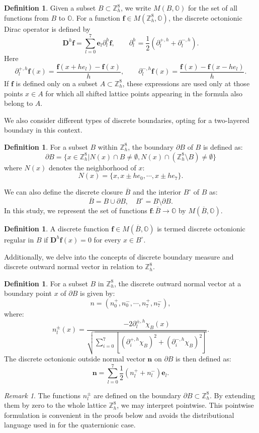 \documentclass{amsart}
\theoremstyle{definition}
\newtheorem{definition}[theorem]{Definition}
\theoremstyle{remark}
\newtheorem{remark}[theorem]{Remark}
\numberwithin{equation}{section}
\newcommand{\p}{\partial}
\newcommand{\OO}{\mathbb O}
\newcommand{\Z}{\mathbb Z}
\newcommand{\f}{\bm{f}}
\newcommand{\e}{\bm{e}}
\begin{document}
 \begin{definition}
 	Given a subset \(B\subset \Z^8_h\), we write \(M(B,\OO)\) for the set of all functions from \(B\) to \(\OO\). For a function \(\f\in M(\Z^8_h,\OO)\), the discrete octonionic Dirac operator is defined by
 	\[
 		\bm D^h \f = \sum_{l=0}^7 \e_l \p^h_l \f,
 		\qquad
 		\p^h_l=\frac12(\p_l^{+,h}+\p_l^{-,h}).
 	\]
 	Here
 	\[
 		\p_l^{+,h}\f(x)=\frac{\f(x+he_l)-\f(x)}{h},
 		\qquad
 		\p_l^{-,h}\f(x)=\frac{\f(x)-\f(x-he_l)}{h}.
 	\]
 	If \(\f\) is defined only on a subset \(A\subset \Z_h^8\), these expressions are used only at those points \(x\in A\) for which all shifted lattice points appearing in the formula also belong to \(A\).
 \end{definition}
 We also consider different types of discrete boundaries, opting for a two-layered boundary in this context.
 \begin{definition}
 	For a subset \(B\) within $\Z^8_h$, the boundary \( \p B \) of \(B\) is defined as:
 	\[ \p B = \{ x \in \Z^8_h | N(x) \cap B \neq \emptyset, N(x) \cap (\Z^8_h \setminus B) \neq \emptyset \} \]
 	where \(N(x)\) denotes the neighborhood of \(x\):
 	\[ N(x) = \{ x, x \pm he_0, \cdots, x \pm he_7 \}. \]
 \end{definition}
 We can also define the discrete closure \( \overline{B} \) and the interior \( B^\circ \) of \(B\) as:
 \[ \overline{B} = B \cup \p B, \quad B^\circ = B \setminus \p B. \]
 In this study, we represent the set of functions \( \f : \overline B \rightarrow \OO \) by \( M(\overline{B}, \OO) \).
 \begin{definition}
 	A discrete function \( \f \in M(\overline{B}, \OO) \) is termed discrete octonionic regular in \(B\) if \( \bm D^h \f(x)=0 \) for every \(x\in B^\circ\).
 \end{definition}
 Additionally, we delve into the concepts of discrete boundary measure and discrete outward normal vector in relation to $\Z^8_h$.
 \begin{definition}\label{2023-09-06 21:09:12}
 	For a subset \(B\) in $\Z^8_h$, the discrete outward normal vector at a boundary point \(x\) of \( \p B \) is given by:
 	\[ n = (n_0^+, n_0^-, \cdots, n_7^+, n_7^-), \]
 	where:
 	\[ n_l^{\pm}(x) = \frac{-2\p_l^{\pm,h} \chi_B(x)}{\sqrt{\sum_{i=0}^7 [\left( \p_i^{+,h} \chi_B \right)^2 + \left( \p_i^{-,h} \chi_B \right)^2 ]}}. \]
 	The discrete octonionic outside normal vector \( \bm n \) on \( \p B \) is then defined as:
 	\[ \bm n = \sum_{l=0}^7 \frac{1}{2}(n_l^+ + n_l^-) \e_l. \]
 \end{definition}
 \begin{remark}
 	The functions \( n_l^{\pm} \) are defined on the boundary \( \p B \subset \Z^8_h \). By extending them by zero to the whole lattice \( \Z^8_h \), we may interpret  pointwise. This pointwise formulation is convenient in the proofs below and avoids the distributional language used in \cite{RZ2017} for the quaternionic case.
 \end{remark}
\end{document}
